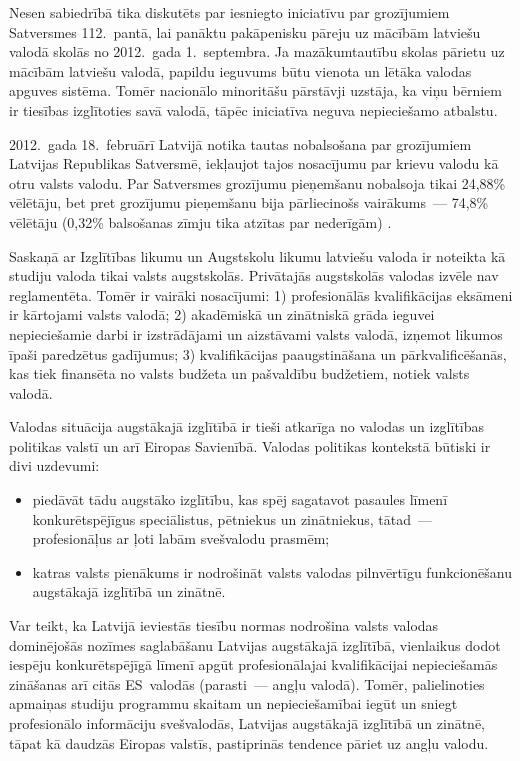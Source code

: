 \begin{multicols}{2}
Nesen sabiedrībā tika diskutēts par iesniegto iniciatīvu par grozījumiem Satversmes 112.~pantā, lai panāktu pakāpenisku pāreju uz mācībām latviešu valodā skolās no 2012.~gada 1.~septembra. 
Ja mazākumtautību skolas pārietu uz mācībām latviešu valodā, papildu ieguvums būtu vienota un lētāka valodas apguves sistēma. 
Tomēr nacionālo minoritāšu pārstāvji uzstāja, ka viņu bērniem ir tiesības izglītoties savā valodā, tāpēc iniciatīva neguva nepieciešamo atbalstu.

2012.~gada 18.~februārī Latvijā notika tautas nobalsošana par grozījumiem Latvijas Republikas Satversmē, iekļaujot tajos nosacījumu par krievu valodu kā otru valsts valodu. 
Par Satversmes grozījumu pieņemšanu nobalsoja tikai 24,88\% vēlētāju, bet pret grozījumu \mbox{pieņemšanu} bija pārliecinošs vairākums~--- 74,8\% vēlētāju (0,32\% balsošanas zīmju tika atzītas par nederīgām) \cite{Meta55}.

Saskaņā ar Izglītības likumu un Augstskolu likumu latviešu valoda ir noteikta kā studiju valoda tikai valsts augstskolās.  Privātajās augstskolās valodas izvēle nav reglamentēta.  Tomēr ir vairāki nosacījumi: 1) profesionālās kvalifikācijas eksāmeni ir kārtojami valsts valodā; 2) akadēmiskā un zinātniskā grāda ieguvei nepieciešamie darbi ir izstrādājami un aizstāvami valsts valodā, izņemot likumos īpaši paredzētus gadījumus; 3) kvalifikācijas paaugstināšana un pārkvalificēšanās, kas tiek finansēta no valsts budžeta un pašvaldību budžetiem, notiek valsts valodā.

Valodas situācija augstākajā izglītībā ir tieši atkarīga no valodas un izglītības politikas valstī un arī Eiropas Savienībā.  Valodas politikas kontekstā būtiski ir divi uzdevumi:

\begin{itemize}
\item  piedāvāt tādu augstāko izglītību, kas spēj sagatavot pasaules līmenī konkurētspējīgus speciālistus, pētniekus un zinātniekus, tātad~--- profesionāļus ar ļoti labām svešvalodu prasmēm;
\item katras valsts pienākums ir nodrošināt valsts valodas pilnvērtīgu funkcionēšanu augstākajā izglītībā un zinātnē.
\end{itemize}

Var teikt, ka Latvijā ieviestās tiesību normas nodrošina valsts valodas dominējošās nozīmes saglabāšanu Latvijas augstākajā izglītībā, vienlaikus dodot iespēju konkurētspējīgā līmenī apgūt profesionālajai kvalifikācijai nepieciešamās zināšanas arī citās ES~valodās (parasti~--- angļu valodā).  Tomēr, palielinoties apmaiņas studiju programmu skaitam un nepieciešamībai iegūt un sniegt profesionālo informāciju svešvalodās, Latvijas augstākajā izglītībā un zinātnē, tāpat kā daudzās Eiropas valstīs, pastiprinās tendence pāriet uz angļu valodu.


\end{multicols}
